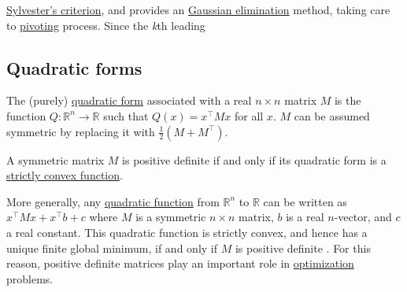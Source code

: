 {{{{{{{{{\begin{itemize}
\href{Sylvester's_criterion}{Sylvester's criterion}, and provides an
\href{Gaussian_elimination}{Gaussian elimination} method, taking care to
\href{pivot_element}{pivoting} process. Since the \emph{k}th leading
\end{itemize}

\hypertarget{quadratic-forms}{%
\subsection{Quadratic forms}\label{quadratic-forms}}

The (purely) \href{quadratic_form}{quadratic form} associated with a
real \(n \times n\) matrix \(M\) is the function
\(Q : \mathbb{R}^n \to \mathbb{R}\) such that \(Q(x) = x^\top  Mx\)
for all \(x\). \(M\) can be assumed symmetric by replacing it with
\(\tfrac{1}{2} \left(M + M^\top \right)\).

A symmetric matrix \(M\) is positive definite if and only if its
quadratic form is a \href{strictly_convex_function}{strictly convex
function}.

More generally, any \href{quadratic_function}{quadratic function} from
\(\mathbb{R}^n\) to \(\mathbb{R}\) can be written as
\(x^\top  Mx + x^\top  b + c\) where \(M\) is a symmetric
\(n \times n\) matrix, \(b\) is a real \(n\)-vector, and \(c\) a real
constant. This quadratic function is strictly convex, and hence has a
unique finite global minimum, if and only if \(M\) is positive definite
. For this reason, positive definite matrices play an important role in
\href{optimization_(mathematics)}{optimization} problems.

\hypertarget{simultaneous-diagonalization}{%
}}}}}}}}}}
